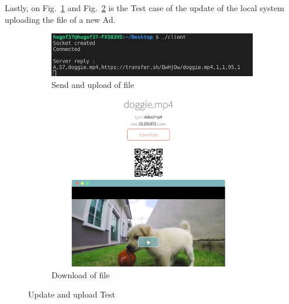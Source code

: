 Lastly, on Fig.~\ref{fig:rs-upload-test} and Fig.~\ref{fig:rs-download-test} is the Test case of the update of the local system uploading the file of a new Ad.
%
\begin{figure}[htb!]
  \centering
  \begin{subfigure}{.7\textwidth}
    \includegraphics[width=\textwidth]{img/rs-upload-test.jpg}%
  \caption{Send and upload of file}%
  \label{fig:rs-upload-test}
  \end{subfigure}
  \begin{subfigure}{.6\textwidth}
    \includegraphics[width=\textwidth]{img/rs-download-test.jpg}%
  \caption{Download of file}%
  \label{fig:rs-download-test}
  \end{subfigure}
  \caption{Update and upload Test}%
  \label{fig:rs-update-upload-test}
\end{figure}
